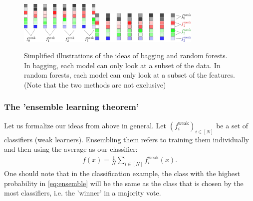 \documentclass{article}
\begin{document}
\begin{figure}
    \centering
    \includegraphics[height=2cm]{graphics/bagging.pdf}\hspace{3cm}\hspace{-1cm}\includegraphics[height=1.5cm]{graphics/boosting.pdf}
    \caption{Simplified illustrations of the ideas of bagging and random forests. In bagging, each model can only look at a subset of the data. In random forests, each model can only look at a subset of the features. (Note that the two methods are not exclusive)}
    \label{fig:bagging_random_forests}
\end{figure}

\subsubsection{The 'ensemble learning theorem'
}
Let us formalize our ideas from above in general. Let $(f_i^{\mathrm{weak}})_{i\in [N]}$ be a set of classifiers (weak learners). Ensembling them refers to training them individually and then using the average as our classifier:
\begin{align} \label{eq:ensemble}
    f(x) = \frac{1}{N}\sum_{i\in [N]}f_i^{\mathrm{weak}}(x).
\end{align}
One should note that in the classification example, the class with the highest probability in \eqref{eq:ensemble} will be the same as the class that is chosen by the most classifiers, i.e. the 'winner' in a majority vote.
\end{document}
